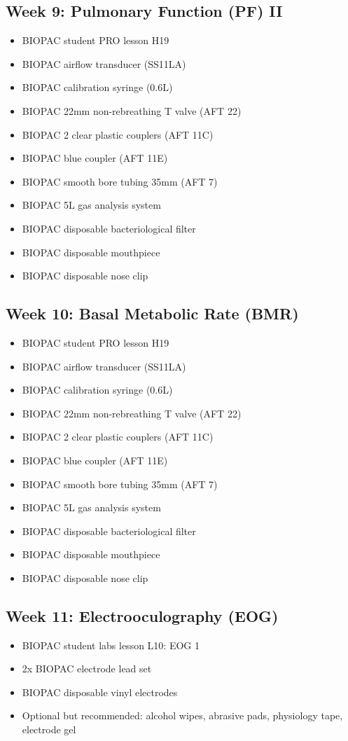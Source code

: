 \documentclass{article}
\begin{document}
\subsection*{Week 9: Pulmonary Function (PF) II}
\begin{itemize}
	\item BIOPAC student PRO lesson H19
	\item BIOPAC airflow transducer (SS11LA)
	\item BIOPAC calibration syringe (0.6L)
	\item BIOPAC 22mm non-rebreathing T valve (AFT 22)
	\item BIOPAC 2 clear plastic couplers (AFT 11C)
	\item BIOPAC blue coupler (AFT 11E)
	\item BIOPAC smooth bore tubing 35mm (AFT 7)
	\item BIOPAC 5L gas analysis system
	\item BIOPAC disposable bacteriological filter
	\item BIOPAC disposable mouthpiece
	\item BIOPAC disposable nose clip
\end{itemize}

\subsection*{Week 10: Basal Metabolic Rate (BMR)}
\begin{itemize}
	\item BIOPAC student PRO lesson H19
	\item BIOPAC airflow transducer (SS11LA)
	\item BIOPAC calibration syringe (0.6L)
	\item BIOPAC 22mm non-rebreathing T valve (AFT 22)
	\item BIOPAC 2 clear plastic couplers (AFT 11C)
	\item BIOPAC blue coupler (AFT 11E)
	\item BIOPAC smooth bore tubing 35mm (AFT 7)
	\item BIOPAC 5L gas analysis system
	\item BIOPAC disposable bacteriological filter
	\item BIOPAC disposable mouthpiece
	\item BIOPAC disposable nose clip
\end{itemize}

\subsection*{Week 11: Electrooculography (EOG)}
\begin{itemize}
	\item BIOPAC student labs lesson L10: EOG 1
	\item 2x BIOPAC electrode lead set 
	\item BIOPAC disposable vinyl electrodes
	\item Optional but recommended: alcohol wipes, abrasive pads, physiology tape, electrode gel
\end{itemize}
\end{document}
